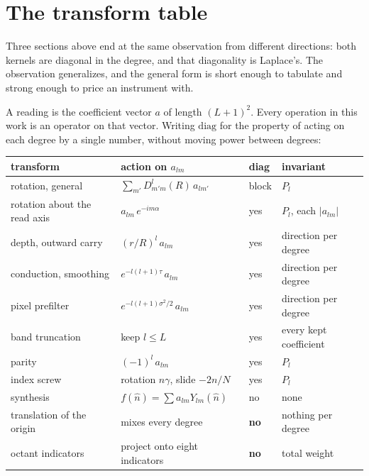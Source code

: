 \section{The transform table}
\label{sec:transforms}

Three sections above end at the same observation from different directions: both kernels are diagonal in the degree, and that diagonality is Laplace's. The observation generalizes, and the general form is short enough to tabulate and strong enough to price an instrument with.

A reading is the coefficient vector \(a\) of length \((L+1)^2\). Every operation in this work is an operator on that vector. Writing \(\mathrm{diag}\) for the property of acting on each degree by a single number, without moving power between degrees:

\begin{center}
\begin{tabular}{llll}
\toprule
transform & action on \(a_{lm}\) & diag & invariant \\
\midrule
rotation, general & \(\sum_{m'} D^{l}_{m'm}(R)\, a_{lm'}\) & block & \(P_l\) \\
rotation about the read axis & \(a_{lm}\, e^{-im\alpha}\) & yes & \(P_l\), each \(|a_{lm}|\) \\
depth, outward carry & \((r/R)^{l}\, a_{lm}\) & yes & direction per degree \\
conduction, smoothing & \(e^{-l(l+1)\tau}\, a_{lm}\) & yes & direction per degree \\
pixel prefilter & \(e^{-l(l+1)\sigma^2/2}\, a_{lm}\) & yes & direction per degree \\
band truncation & keep \(l \le L\) & yes & every kept coefficient \\
parity & \((-1)^{l}\, a_{lm}\) & yes & \(P_l\) \\
index screw & rotation \(n\gamma\), slide \(-2n/N\) & yes & \(P_l\) \\
synthesis & \(f(\hat n) = \sum a_{lm} Y_{lm}(\hat n)\) & no & none \\
translation of the origin & mixes every degree & \textbf{no} & nothing per degree \\
octant indicators & project onto eight indicators & \textbf{no} & total weight \\
\bottomrule
\end{tabular}
\end{center}

